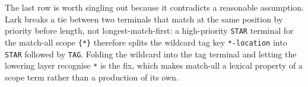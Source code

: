 \begin{remark}\label{rem:lark-priority}
The last row is worth singling out because it contradicts a reasonable assumption. Lark
breaks a tie between two terminals that match at the same position by priority before
length, not longest-match-first: a high-priority \texttt{STAR} terminal for the match-all
scope \texttt{\{*\}} therefore splits the wildcard tag key \texttt{*-location} into
\texttt{STAR} followed by \texttt{TAG}. Folding the wildcard into the tag terminal and
letting the lowering layer recognise \texttt{*} is the fix, which makes match-all a
lexical property of a scope term rather than a production of its own.
\end{remark}
